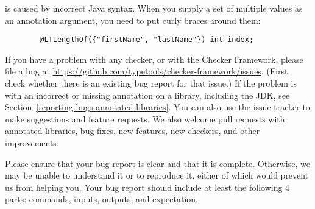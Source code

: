\noindent
is caused by incorrect Java syntax.  When you supply a set of multiple
values as an annotation argument, you need to put curly braces around them:

\begin{Verbatim}
        @LTLengthOf({"firstName", "lastName"}) int index;
\end{Verbatim}



If you have a problem with any checker, or with the Checker Framework,
please file a bug at
\url{https://github.com/typetools/checker-framework/issues}.
(First, check whether there is an existing bug report for that issue.)
If the problem is with an incorrect or missing annotation on a library,
including the JDK, see Section~\ref{reporting-bugs-annotated-libraries}.
You can also use the issue tracker to make suggestions and feature
requests.  We also welcome pull requests with annotated libraries, bug
fixes, new features, new checkers, and other improvements.

Please ensure that your bug report is clear and that it is complete.
Otherwise, we may be unable to understand it or to reproduce it, either of
which would prevent us from helping you.  Your bug report should include at
least the following 4 parts: commands, inputs, outputs, and expectation.

